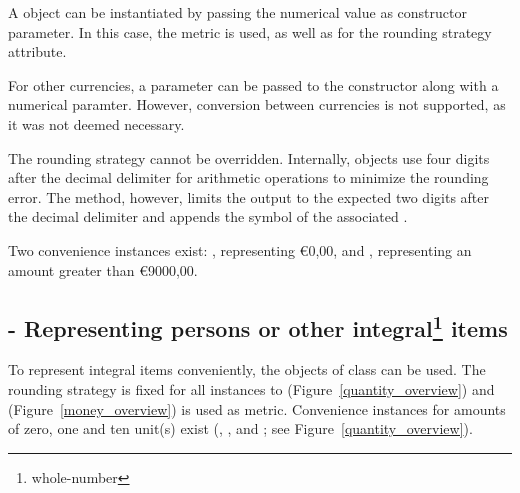 A  object can be instantiated by passing the numerical value as constructor parameter.
In this case, the metric  is used, as well as  for the rounding strategy attribute.

For other currencies, a  parameter can be passed to the constructor along with a numerical paramter.
However, conversion between currencies is not supported, as it was not deemed necessary.

The rounding strategy cannot be overridden.
Internally,  objects use four digits after the decimal delimiter for arithmetic operations to minimize the rounding error.
The  method, however, limits the output to the expected two digits after the decimal delimiter and appends the symbol of the associated .

Two convenience instances exist: , representing \euro{0,00}, and , representing an amount greater than \euro{9000,00}.

\subsection[]{ - Representing persons or other integral\protect\footnote{whole-number} items}
To represent integral items conveniently, the objects of class  can be used.
The rounding strategy is fixed for all instances to  (Figure~\ref{quantity_overview}) and  (Figure~\ref{money_overview}) is used as metric.
Convenience instances for amounts of zero, one and ten unit(s) exist (, , and ; see Figure~\ref{quantity_overview}).
